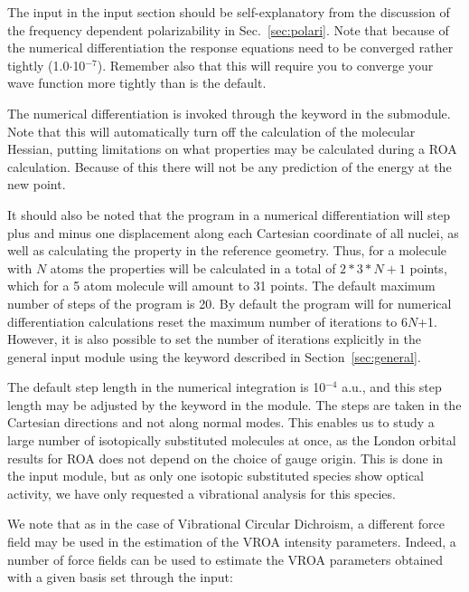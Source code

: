 The input in the  input section should be
self-explanatory from the discussion of the frequency dependent
polarizability in Sec.~\ref{sec:polari}. Note
that because of the numerical differentiation the response equations need to be converged
rather tightly (1.0$\cdot$10$^{-7}$). Remember also that this will
require you to converge your wave function more
tightly than is the default.

The numerical differentiation is
invoked through the keyword
 in the  submodule. Note that this will
automatically
turn off the calculation of the molecular Hessian,
putting limitations
on what properties may be calculated during a ROA calculation. Because
of this there will not be any prediction of the energy at the new
point.

It should also be noted that the program in a numerical differentiation will
step plus and minus one displacement along each Cartesian
coordinate
of all nuclei, as well as calculating the property in the reference
geometry. Thus, for a molecule with $N$ atoms the properties will be
calculated in a total of $2*3*N + 1$ points, which for a 5 atom
molecule will amount to 31 points. The default maximum number of steps
of the program is 20. By default the program will for numerical
differentiation calculations reset the maximum number of iterations to
6$N$+1. However, it is also possible to set the number of iterations
explicitly  in the general input module using the keyword 
described in Section~\ref{sec:general}.

The default step length in the numerical integration is 10$^{-4}$
a.u., and this step length may be adjusted by the keyword
 in the  module. The steps are taken in
the Cartesian directions and
not along normal modes. This enables us to study a
large number of
isotopically substituted molecules at
once, as the London orbital 
results for ROA does not depend on the choice of gauge origin. This is
done in the  input module, but as only one isotopic
substituted species show optical activity, we have only requested a
vibrational analysis for this species.

We note that as in the case of Vibrational Circular Dichroism, a different
force field may be used in the estimation of the VROA intensity
parameters. Indeed, a number of force fields can be used to estimate
the VROA parameters obtained with a given basis set through the input:

